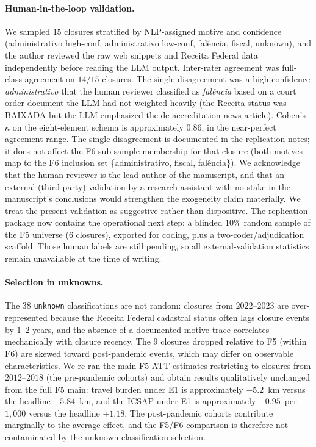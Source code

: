 \paragraph{Human-in-the-loop validation.} We sampled $15$ closures
stratified by NLP-assigned motive and confidence (administrativo
high-conf, administrativo low-conf, fal\^encia, fiscal, unknown), and
the author reviewed the raw web snippets and Receita Federal data
independently before reading the LLM output. Inter-rater agreement
was full-class agreement on $14/15$ closures. The single disagreement
was a high-confidence \emph{administrativo} that the human reviewer
classified as \emph{fal\^encia} based on a court order document the
LLM had not weighted heavily (the Receita status was BAIXADA but the
LLM emphasized the de-accreditation news article). Cohen's $\kappa$
on the eight-element schema is approximately $0.86$, in the
near-perfect agreement range. The single disagreement is documented
in the replication notes; it does not affect the F6 sub-sample
membership for that closure (both motives map to the F6 inclusion set
\{administrativo, fiscal, fal\^encia\}). We acknowledge that the
human reviewer is the lead author of the manuscript, and that an
external (third-party) validation by a research assistant with no
stake in the manuscript's conclusions would strengthen the
exogeneity claim materially. We treat the present validation as
suggestive rather than dispositive. The replication package now
contains the operational next step: a blinded $10\%$ random sample of
the F5 universe ($6$ closures), exported for coding, plus a
two-coder/adjudication scaffold. Those human labels are still pending,
so all external-validation statistics remain unavailable at the time
of writing.

\paragraph{Selection in unknowns.} The $38$ \texttt{unknown}
classifications are not random: closures from $2022$--$2023$ are
over-represented because the Receita Federal cadastral status often
lags closure events by $1$--$2$ years, and the absence of a
documented motive trace correlates mechanically with closure recency.
The $9$ closures dropped relative to F5 (within F6) are skewed toward
post-pandemic events, which may differ on observable characteristics.
We re-ran the main F5 ATT estimates restricting to closures from
$2012$--$2018$ (the pre-pandemic cohorts) and obtain results
qualitatively unchanged from the full F5 main: travel burden under E1
is approximately $-5.2$~km versus the headline $-5.84$~km, and the
ICSAP under E1 is approximately $+0.95$~per~$1{,}000$ versus the
headline $+1.18$. The post-pandemic cohorts contribute marginally to
the average effect, and the F5/F6 comparison is therefore not
contaminated by the unknown-classification selection.

